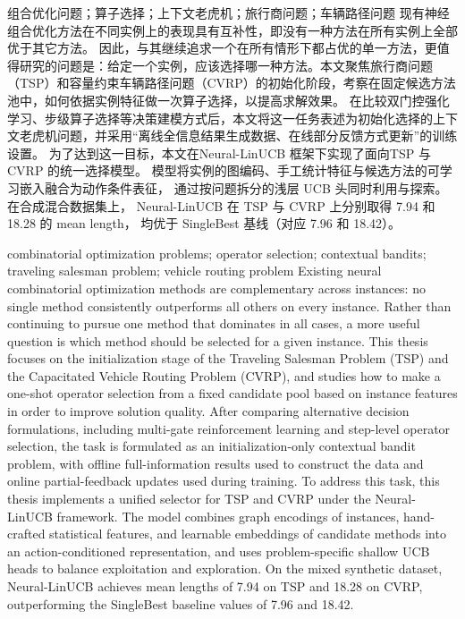 
\begin{中文摘要}{组合优化问题；算子选择；上下文老虎机；旅行商问题；车辆路径问题}
现有神经组合优化方法在不同实例上的表现具有互补性，即没有一种方法在所有实例上全部优于其它方法。
因此，与其继续追求一个在所有情形下都占优的单一方法，更值得研究的问题是：给定一个实例，应该选择哪一种方法。本文聚焦旅行商问题（TSP）和容量约束车辆路径问题（CVRP）的初始化阶段，考察在固定候选方法池中，如何依据实例特征做一次算子选择，以提高求解效果。
在比较双门控强化学习、步级算子选择等决策建模方式后，本文将这一任务表述为初始化选择的上下文老虎机问题，并采用“离线全信息结果生成数据、在线部分反馈方式更新”的训练设置。
为了达到这一目标，本文在Neural-LinUCB 框架下实现了面向TSP 与 CVRP 的统一选择模型。
模型将实例的图编码、手工统计特征与候选方法的可学习嵌入融合为动作条件表征，
通过按问题拆分的浅层 UCB 头同时利用与探索。
在合成混合数据集上，
Neural-LinUCB 在 TSP 与 CVRP 上分别取得 7.94 和 18.28 的 mean length，
均优于 SingleBest 基线（对应 7.96 和 18.42）。
\end{中文摘要}

\begin{英文摘要}{combinatorial optimization problems; operator selection; contextual bandits; traveling salesman problem; vehicle routing problem}
Existing neural combinatorial optimization methods are complementary across instances: no single method consistently outperforms all others on every instance. Rather than continuing to pursue one method that dominates in all cases, a more useful question is which method should be selected for a given instance. This thesis focuses on the initialization stage of the Traveling Salesman Problem (TSP) and the Capacitated Vehicle Routing Problem (CVRP), and studies how to make a one-shot operator selection from a fixed candidate pool based on instance features in order to improve solution quality.
After comparing alternative decision formulations, including multi-gate reinforcement learning and step-level operator selection, the task is formulated as an initialization-only contextual bandit problem, with offline full-information results used to construct the data and online partial-feedback updates used during training. To address this task, this thesis implements a unified selector for TSP and CVRP under the Neural-LinUCB framework.
The model combines graph encodings of instances, hand-crafted statistical features, and learnable embeddings of candidate methods into an action-conditioned representation, and uses problem-specific shallow UCB heads to balance exploitation and exploration.
On the mixed synthetic dataset, Neural-LinUCB achieves mean lengths of 7.94 on TSP and 18.28 on CVRP, outperforming the SingleBest baseline values of 7.96 and 18.42.
\end{英文摘要}
\cleardoublepage
